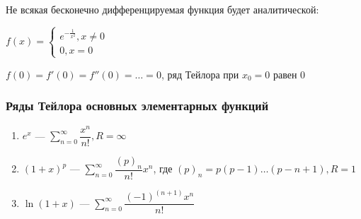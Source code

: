 Не всякая бесконечно дифференцируемая функция будет аналитической:

\begin{example}
$f(x) = \begin{cases}
      e^{-\frac{1}{x^2}}, x \neq 0 \\
      0, x = 0
\end{cases}$

$f(0) = f'(0) = f''(0) = \dots = 0$, ряд Тейлора при $x_0 = 0$ равен 0
\end{example}

\subsubsection{Ряды Тейлора основных элементарных функций}

\begin{enumerate}
\item $e^x$ --- $\sum_{n=0}^{\infty} \dfrac{x^n}{n!}, R = \infty$
\item $(1+x)^p$ --- $\sum_{n=0}^{\infty} \dfrac{(p)_n}{n!}x^n$, где $(p)_n = p(p-1)\dots(p - n + 1), R = 1$
\item $\ln(1 + x)$ --- $\sum_{n=0}^{\infty} \dfrac{(-1)^{(n+1)} x^n}{n!}$
\end{enumerate}